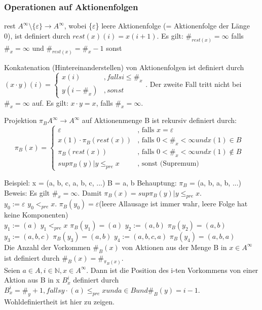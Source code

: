 \subsubsection*{Operationen auf Aktionenfolgen}
\begin{description}
	\item{rest} $A^\infty \setminus \{\varepsilon\} \rightarrow A^\infty$, wobei \{$\varepsilon$\} leere Aktionenfolge (= Aktionenfolge der Länge 0), ist definiert durch $rest(x)(i) = x(i+1)$. Es gilt: $\#_{rest(x)} = \infty$ falls $\#_x = \infty$ und $\#_{rest(x)} = \#_x - 1$ sonst
	\item {Konkatenation (Hintereinanderstellen)} von Aktionenfolgen ist definiert durch $(x \cdot y)(i) =
	\begin{cases}
	x(i) &,falls i \leq \#_x \\
	y(i-\#_x)&,sonst
	\end{cases}$. Der zweite Fall tritt nicht bei $\#_x = \infty$ auf. Es gilt: $x \cdot y = x$, falls $\#_x = \infty$.\\
	\item{Projektion} $\pi_B A^\infty \rightarrow A^\infty$ auf Aktionenmenge B ist rekursiv definiert durch:\\
\begin{equation*}
	\pi_B(x) = \begin{cases}
		\varepsilon &\text{, falls $x = \varepsilon$} \\
		x(1)\cdot \pi_B(rest(x)) &\text{, falls $0 < \#_x < \infty und x(1) \in B $}\\
		\pi_B(rest(x)) &\text{, falls $0 < \#_x < \infty und x(1) \notin B$ }\\
		sup{\pi_B(y) | y \le_{pre} x} &\text{, sonst (Supremum)}
	\end{cases}
\end{equation*}
\end{description}
Beispiel:
x = (a, b, c, a, b, c, ...)
B = {a, b}
Behauptung: $\pi_B$ = (a, b, a, b, ...)
Beweis: Es gilt $\#_x = \infty$. Damit $\pi_B(x) = sup{\pi_B(y) | y \le_{pre} x}$. \\
$y_0 := \varepsilon$ $y_0 <_{pre} x$. $\pi_B(y_0) = \varepsilon$(leere Allausage ist immer wahr, leere Folge hat keine Komponenten) \\
$y_1 := (a)$ $y_1 <_{pre} x$ $\pi_B(y_1) = (a)$
$y_2 := (a, b)$ $\pi_B(y_2) = (a, b)$
$y_3 := (a, b, c)$ $\pi_B(y_3) = (a, b)$
$y_4 := (a, b, c, a)$ $\pi_B(y_4) = (a, b, a)$
\\
Die Anzahl der Vorkommen $\#_B(x)$ von Aktionen aus der Menge B in $x \in A^{\infty}$ ist definiert durch $\#_B(x) = \#_{\pi_B(x)}$.
\\
Seien $a \in A, i \in \mathbb{N}, x \in A^{\infty}$. Dann ist die Position des i-ten Vorkommens von einer Aktion aus B in x \emph{$B^i_x$} definiert durch  $B^i_x = \#_y+1, falls y \cdot (a) \leq_{pre}x und a \in B und \#_B(y) = i - 1$.\\
Wohldefiniertheit ist hier zu zeigen.\\

